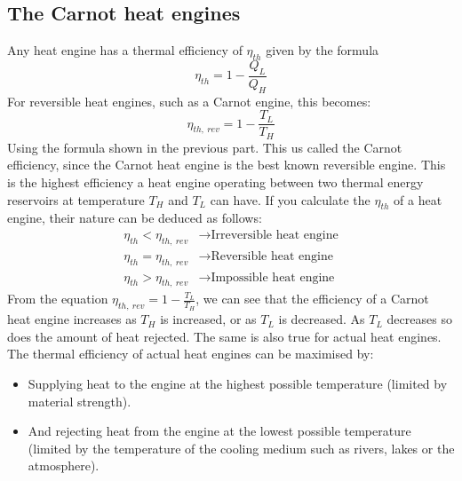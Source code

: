 \documentclass[class=report, crop=false, 12pt,a4paper]{standalone}
\begin{document}
\subsection{The Carnot heat engines}
Any heat engine has a thermal efficiency of $\eta_{th}$ given by the formula
\begin{equation} 
  \eta_{th} = 1 - \frac{Q_L}{Q_H} 
\end{equation}
For reversible heat engines, such as a Carnot engine, this becomes:
\begin{equation} 
  \eta_{th, \ rev} = 1 - \frac{T_L}{T_H}
\end{equation}
Using the formula shown in the previous part. This us called the Carnot efficiency, since the Carnot heat engine is the best known reversible engine. This is the highest efficiency a heat engine operating between two thermal energy reservoirs at temperature $T_H$ and $T_L$ can have. If you calculate the $\eta_{th}$ of a heat engine, their nature can be deduced as follows:
\begin{align} 
  \eta_{th} < \eta_{th, \ rev} &\rightarrow \textrm{Irreversible heat engine} \\
  \eta_{th} = \eta_{th, \ rev} &\rightarrow \textrm{Reversible heat engine} \\
  \eta_{th} > \eta_{th, \ rev} &\rightarrow \textrm{Impossible heat engine} 
\end{align}
From the equation $\eta_{th, \ rev} = 1 - \frac{T_L}{T_H}$, we can see that the efficiency of a Carnot heat engine increases as $T_H$ is increased, or as $T_L$ is decreased. As $T_L$ decreases so does the amount of heat rejected. The same is also true for actual heat engines. The thermal efficiency of actual heat engines can be maximised by:
\begin{itemize}[noitemsep]
  \item Supplying heat to the engine at the highest possible temperature (limited by material strength).
  \item And rejecting heat from the engine at the lowest possible temperature (limited by the temperature of the cooling medium such as rivers, lakes or the atmosphere).
\end{itemize}
\end{document}
